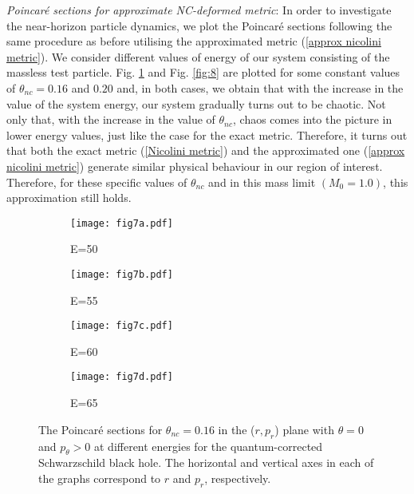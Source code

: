 \documentclass[aps,prd,showpacs,nofootinbib,floats,floatfix,preprintnumbers,groupedaddress,twocolumn]{revtex4-1}
\begin{document}
%
%
\par\noindent
{\it{Poincar\'e sections for approximate NC-deformed metric}}:    In order to investigate the near-horizon particle dynamics, we plot  the Poincar\'e sections following the same procedure as before utilising the approximated metric (\ref{approx nicolini metric}). We consider  different values of energy of our system consisting of the massless test particle. Fig. \ref{fig:7} and Fig. \ref{fig:8} are plotted for some constant values of $\theta_{nc}=0.16$ and $0.20$ and, in both cases, we obtain that with the increase in the value of the system energy, our system gradually turns out to be chaotic. Not only that, with the increase in the value of $\theta_{nc}$, chaos comes into the picture in lower energy values, just like the case for the exact metric. Therefore, it turns out that both the exact metric (\ref{Nicolini metric}) and the approximated one (\ref{approx nicolini metric}) generate similar  physical behaviour in our region of interest. Therefore, for these specific values of $\theta_{nc}$ and in this mass limit $(M_0=1.0)$, this approximation still holds.
%
%
%
%
\begin{figure}[H]
	\centering
	\begin{subfigure}[b]{0.4\linewidth}
		\texttt{[image: fig7a.pdf]}
		\caption{E=50}
	\end{subfigure}
	\begin{subfigure}[b]{0.4\linewidth}
		\texttt{[image: fig7b.pdf]}
		\caption{E=55}
	\end{subfigure}
	\begin{subfigure}[b]{0.4\linewidth}
		\texttt{[image: fig7c.pdf]}
		\caption{E=60}
	\end{subfigure}
	\begin{subfigure}[b]{0.4\linewidth}
		\texttt{[image: fig7d.pdf]}
		\caption{E=65}
	\end{subfigure}
	\caption{The Poincar\'e sections for $\theta_{nc} = 0.16$ in the ($r,p_r$) plane with $\theta = 0$ and $p_\theta > 0$ at different energies for the quantum-corrected Schwarzschild black hole. The horizontal and vertical axes in each of the graphs correspond to $r$ and $p_r$, respectively.}
	\label{fig:7}
\end{figure}
\end{document}

